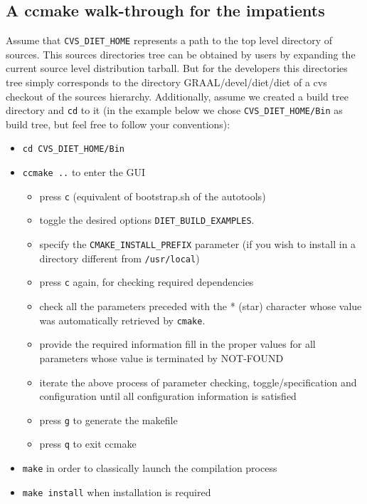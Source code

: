 \subsection{A ccmake walk-through for the impatients}

Assume that \verb+CVS_DIET_HOME+ represents a path to the top level directory
of \diet sources.  This \diet sources directories tree can be obtained by \diet
users by expanding the \diet current source level distribution tarball. But for
the \diet developers this directories tree simply corresponds to the directory
GRAAL/devel/diet/diet of a cvs checkout of the \diet sources hierarchy.
Additionally, assume we created a build tree directory and \verb+cd+ to it (in
the example below we chose \verb+CVS_DIET_HOME/Bin+ as build tree, but feel
free to follow your conventions):
\begin{itemize}
\item
  \verb+cd CVS_DIET_HOME/Bin+
\item
  \verb+ccmake ..+ to enter the GUI
  \begin{itemize}
  \item press \verb+c+ (equivalent of bootstrap.sh of the autotools)
  \item toggle the desired options \eg \verb+DIET_BUILD_EXAMPLES+. 
  \item specify the \verb+CMAKE_INSTALL_PREFIX+ parameter (if you wish to
    install in a directory different from \verb+/usr/local+)
  \item press \verb+c+ again, for checking required dependencies
  \item check all the parameters preceded with the * (star) character
    whose value was automatically retrieved by \verb+cmake+.
  \item provide the required information \ie fill in the proper values for all
    parameters whose value is terminated by NOT-FOUND
  \item iterate the above process of parameter checking, toggle/specification
    and configuration until all configuration information is satisfied
  \item press \verb+g+ to generate the makefile
  \item press \verb+q+ to exit ccmake
  \end{itemize}
\item
  \verb+make+ in order to classically launch the compilation process
\item
  \verb+make install+ when installation is required
\end{itemize}

